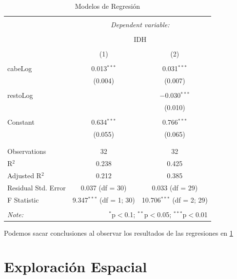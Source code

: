 \documentclass{article}
\begin{document}
\begin{table}[!htbp] \centering 
  \caption{Modelos de Regresión} 
  \label{regresiones} 
\begin{tabular}{@{\extracolsep{5pt}}lcc} 
\\[-1.8ex]\hline 
\hline \\[-1.8ex] 
 & \multicolumn{2}{c}{\textit{Dependent variable:}} \\ 
\cline{2-3} 
\\[-1.8ex] & \multicolumn{2}{c}{IDH} \\ 
\\[-1.8ex] & (1) & (2)\\ 
\hline \\[-1.8ex] 
 cabeLog & 0.013$^{***}$ & 0.031$^{***}$ \\ 
  & (0.004) & (0.007) \\ 
  & & \\ 
 restoLog &  & $-$0.030$^{***}$ \\ 
  &  & (0.010) \\ 
  & & \\ 
 Constant & 0.634$^{***}$ & 0.766$^{***}$ \\ 
  & (0.055) & (0.065) \\ 
  & & \\ 
\hline \\[-1.8ex] 
Observations & 32 & 32 \\ 
R$^{2}$ & 0.238 & 0.425 \\ 
Adjusted R$^{2}$ & 0.212 & 0.385 \\ 
Residual Std. Error & 0.037 (df = 30) & 0.033 (df = 29) \\ 
F Statistic & 9.347$^{***}$ (df = 1; 30) & 10.706$^{***}$ (df = 2; 29) \\ 
\hline 
\hline \\[-1.8ex] 
\textit{Note:}  & \multicolumn{2}{r}{$^{*}$p$<$0.1; $^{**}$p$<$0.05; $^{***}$p$<$0.01} \\ 
\end{tabular} 
\end{table} 
Podemos sacar conclusiones al observar los resultados de las  regresiones en \ref{regresiones}

\section{Exploración Espacial}
\end{document}

